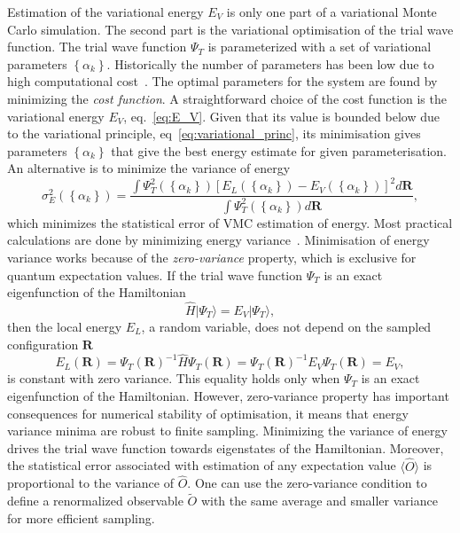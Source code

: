 \documentclass[final,3p,times,twocolumn]{elsarticle}
\begin{document}
	Estimation of the variational energy $E_V$ is only one part of a variational Monte Carlo simulation. The second part is the variational optimisation of the trial wave function. The trial wave function $\Psi_T$ is parameterized with a set of variational parameters $\left\{\alpha_k\right\}$. Historically the number of parameters has been low due to high computational cost~\cite{foulkes2001quantum}. The optimal parameters for the system are found by minimizing the \emph{cost function}. A straightforward choice of the cost function is the variational energy $E_V$, eq.~\eqref{eq:E_V}. Given that its value is bounded below due to the variational principle, eq~\eqref{eq:variational_princ}, its minimisation gives parameters $\left\{\alpha_k\right\}$ that give the best energy estimate for given parameterisation. An alternative is to minimize the variance of energy
	\begin{equation}
		\sigma_{E}^{2}(\left\{\alpha_k\right\})=\frac{\int \Psi_{T}^{2}(\left\{\alpha_k\right\})\left[E_{L}(\left\{\alpha_k\right\})-E_{V}(\left\{\alpha_k\right\})\right]^{2} d \mathbf{R}}{\int \Psi_{T}^{2}(\left\{\alpha_k\right\}) d \mathbf{R}},
	\end{equation}	
	which minimizes the statistical error of VMC estimation of energy. Most practical calculations are done by minimizing energy variance~\cite{foulkes2001quantum}. Minimisation of energy variance works because of the \emph{zero-variance} property, which is exclusive for quantum expectation values. If the trial wave function $\Psi_{T}$ is an exact eigenfunction of the Hamiltonian
	\begin{equation}
		\hat H |\Psi_{T}\rangle = E_V |\Psi_{T}\rangle,
	\end{equation}
	then the local energy $E_L$, a random variable, does not depend on the sampled configuration $\mathbf{R}$ 
	\begin{equation}				
		E_{L}(\mathbf{R})=\Psi_{T}(\mathbf{R})^{-1} \hat{H} \Psi_{T}(\mathbf{R}) = \Psi_{T}(\mathbf{R})^{-1} E_V \Psi_{T}(\mathbf{R}) = E_V,
	\end{equation}
	is constant with zero variance. This equality holds only when $\Psi_{T}$ is an exact eigenfunction of the Hamiltonian. However, zero-variance property has important consequences for numerical stability of optimisation, it means that energy variance minima are robust to finite sampling. Minimizing the variance of energy drives the trial wave function towards eigenstates of the Hamiltonian. Moreover, the statistical error associated with estimation of any expectation value $\langle \hat O \rangle$ is proportional to the variance of $\hat O$. One can use the zero-variance condition to define a renormalized observable $\tilde O$ with the same average and smaller variance~\cite{assaraf1999zero} for more efficient sampling. 
\end{document}
